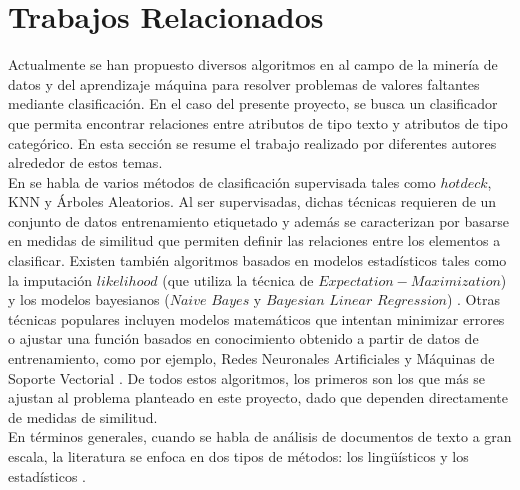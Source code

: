 \section{Trabajos Relacionados}
Actualmente se han propuesto diversos algoritmos en al campo de la minería de datos y del aprendizaje máquina para resolver problemas de valores faltantes mediante clasificación. En el caso del presente proyecto, se busca un clasificador que permita encontrar relaciones entre atributos de tipo texto y atributos de tipo categórico. En esta sección se resume el trabajo realizado por diferentes autores alrededor de estos temas. \\
En \cite{tran2015multiple,truong2004learning, ishioka2014investigations} se habla de varios métodos de clasificación supervisada tales como $hot deck$, KNN y Árboles Aleatorios. Al ser supervisadas, dichas técnicas requieren de un conjunto de datos entrenamiento etiquetado y además se caracterizan por basarse en medidas de similitud que permiten definir las relaciones entre los elementos a clasificar. Existen también algoritmos basados en modelos estadísticos tales como la imputación $likelihood$ (que utiliza la técnica de $Expectation-Maximization$) \cite{anagnostopoulos2014scaling} y los modelos bayesianos ($Naive$ $Bayes$ y $Bayesian$ $Linear$ $Regression$) \cite{mavai2014survey}. Otras técnicas populares incluyen modelos matemáticos que intentan minimizar errores o ajustar una función basados en conocimiento obtenido a partir de datos de entrenamiento, como por ejemplo, Redes Neuronales Artificiales \cite{nelwamondo2007missing} y Máquinas de Soporte Vectorial \cite{hsu2003practical}. De todos estos algoritmos, los primeros son los que más se ajustan al problema planteado en este proyecto, dado que dependen directamente de medidas de similitud.\\
En términos generales, cuando se habla de análisis de documentos de texto a gran escala, la literatura se enfoca en dos tipos de métodos: los lingüísticos y los estadísticos \cite{srivastava2009text}. \\
